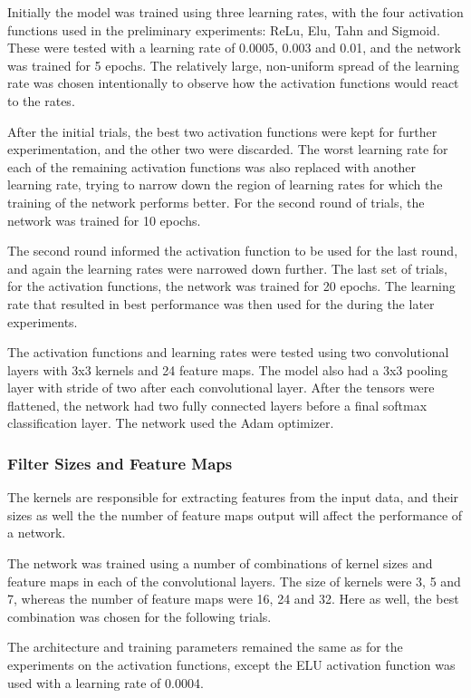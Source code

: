\documentclass[]{article}
\begin{document}
Initially the model was trained using three learning rates, with the four activation functions used in the preliminary experiments: ReLu, Elu, Tahn and Sigmoid. These were tested with a learning rate of 0.0005, 0.003 and 0.01, and the network was trained for 5 epochs. The relatively large, non-uniform spread of the learning rate was chosen intentionally to observe how the activation functions would react to the rates.

After the initial trials, the best two activation functions were kept for further experimentation, and the other two were discarded. The worst learning rate for each of the remaining activation functions was also replaced with another learning rate, trying to narrow down the region of learning rates for which the training of the network performs better. For the second round of trials, the network was trained for 10 epochs. 

The second round informed the activation function to be used for the last round, and again the learning rates were narrowed down further. The last set of trials, for the activation functions, the network was trained for 20 epochs. The learning rate that resulted in best performance was then used for the during the later experiments. 

The activation functions and learning rates were tested using two convolutional layers with 3x3 kernels and 24 feature maps. The model also had a 3x3 pooling layer with stride of two after each convolutional layer. After the tensors were flattened, the network had two fully connected layers before a final softmax classification layer. The network used the Adam optimizer. 

\subsubsection{Filter Sizes and Feature Maps}

The kernels are responsible for extracting features from the input data, and their sizes as well the the number of feature maps output will affect the performance of a network. 

The network was trained using a number of combinations of kernel sizes and feature maps in each of the convolutional layers. The size of kernels were 3, 5 and 7, whereas the number of feature maps were 16, 24 and 32. Here as well, the best combination was chosen for the following trials.

The architecture and training parameters remained the same as for the experiments on the activation functions, except the ELU activation function was used with a learning rate of 0.0004. 
\end{document}
